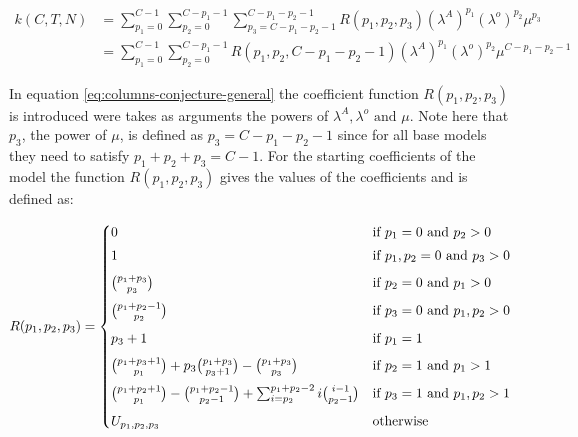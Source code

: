 \begin{align}\label{eq:columns-conjecture-general}
    k(C,T,N) &= \sum_{p_1=0}^{C-1} \sum_{p_2=0}^{C-p_1-1} 
    \sum_{p_3=C - p_1 - p_2 - 1}^{C - p_1 - p_2 - 1} R(p_1, p_2, p_3) 
    (\lambda^A)^{p_1} (\lambda^o)^{p_2} \mu^{p_3} \nonumber \\ 
    &= \sum_{p_1=0}^{C-1} \sum_{p_2=0}^{C-p_1-1} R(p_1, p_2, C-p_1-p_2-1) 
    (\lambda^A)^{p_1} (\lambda^o)^{p_2} \mu^{C-p_1-p_2-1} 
\end{align}

In equation \ref{eq:columns-conjecture-general} the coefficient function 
\(R(p_1,p_2,p_3)\) is introduced were takes as arguments the powers of 
\(\lambda^A, \lambda^o \text{ and } \mu\). 
Note here that \(p_3\), the power of \(\mu\), is defined as \(p_3=C-p_1-p_2-1\) 
since for all base models they need to satisfy \(p_1 + p_2 + p_3 = C-1\). 
For the starting coefficients of the model the function \(R(p_1,p_2,p_3)\) gives 
the values of the coefficients and is defined as:

\begin{equation} \label{eq:coefficient-function}
    R(p_1,p_2,p_3) = 
    \begin{cases}
        0 & \text{if } p_1 = 0 \text{ and } p_2 > 0 \vspace{0.1cm} \\
        1 & \text{if } p_1, p_2 = 0 \text{ and } p_3 > 0 \vspace{0.2cm} \\
        \binom{p_1 + p_3}{p_3} & \text{if } p_2 = 0 
        \text{ and } p_1 > 0 \vspace{0.2cm} \\
        \binom{p_1 + p_2 - 1}{p_2} & \text{if } p_3 = 0 
        \text{ and } p_1, p_2 > 0 \vspace{0.2cm} \\
        p_3 + 1 & \text{if } p_1 = 1 \vspace{0.2cm} \\
        \binom{p_1 + p_3 + 1}{p_1} + p_3 \binom{p_1 + p_3}{p_3+1} - 
        \binom{p_1 + p_3}{p_3} & \text{if } p_2 = 1 
        \text{ and } p_1 > 1 \vspace{0.2cm} \\
        \binom{p_1 + p_2 + 1}{p_1} - \binom{p_1 + p_2 - 1}{p_2-1} + 
        \sum_{i=p_2}^{p_1 + p_2 - 2} i \binom{i-1}{p_2 - 1} & \text{if } p_3 = 1 
        \text{ and } p_1,p_2 > 1 \vspace{0.2cm} \\
        U_{p_1,p_2,p_3} & \text{otherwise}
    \end{cases}
\end{equation}

